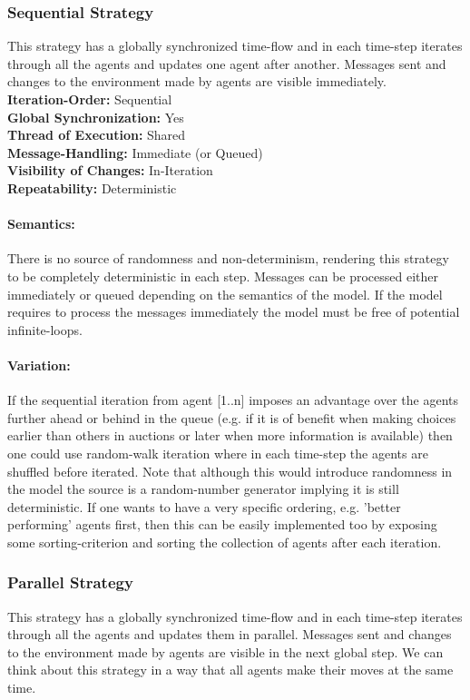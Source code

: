 \subsubsection{Sequential Strategy}
This strategy has a globally synchronized time-flow and in each time-step iterates through all the agents and updates one agent after another. Messages sent and changes to the environment made by agents are visible immediately. \\

\textbf{Iteration-Order:} Sequential \\
\textbf{Global Synchronization:} Yes \\
\textbf{Thread of Execution:} Shared \\
\textbf{Message-Handling:} Immediate (or Queued) \\
\textbf{Visibility of Changes:}	In-Iteration \\
\textbf{Repeatability:}	Deterministic
	
\paragraph{Semantics:} There is no source of randomness and non-determinism, rendering this strategy to be completely deterministic in each step. Messages can be processed either immediately or queued depending on the semantics of the model. If the model requires to process the messages immediately the model must be free of potential infinite-loops.

\paragraph{Variation:} If the sequential iteration from agent [1..n] imposes an advantage over the agents further ahead or behind in the queue (e.g. if it is of benefit when making choices earlier than others in auctions or later when more information is available) then one could use random-walk iteration where in each time-step the agents are shuffled before iterated. Note that although this would introduce randomness in the model the source is a random-number generator implying it is still deterministic. If one wants to have a very specific ordering, e.g. 'better performing' agents first, then this can be easily implemented too by exposing some sorting-criterion and sorting the collection of agents after each iteration. \\

\subsubsection{Parallel Strategy}
This strategy has a globally synchronized time-flow and in each time-step iterates through all the agents and updates them in parallel. Messages sent and changes to the environment made by agents are visible in the next global step. We can think about this strategy in a way that all agents make their moves at the same time. \\

